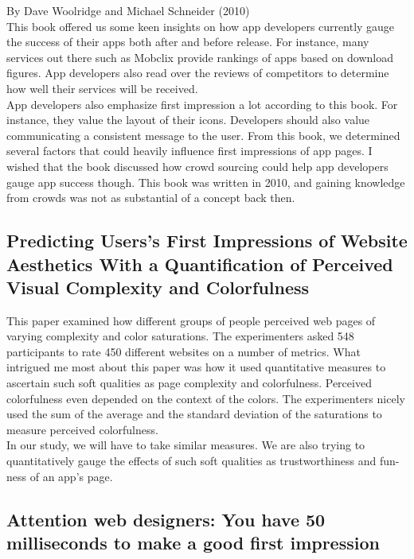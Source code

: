 By Dave Woolridge and Michael Schneider (2010) \\

This book offered us some keen insights on how app developers currently gauge the success of their apps both after and before release. For instance, many services out there such as Mobclix provide rankings of apps based on download figures. App developers also read over the reviews of competitors to determine how well their services will be received. \\

App developers also emphasize first impression a lot according to this book. For instance, they value the layout of their icons. Developers should also value communicating a consistent message to the user. From this book, we determined several factors that could heavily influence first impressions of app pages. I wished that the book discussed how crowd sourcing could help app developers gauge app success though. This book was written in 2010, and gaining knowledge from crowds was not as substantial of a concept back then.

\subsection{Predicting Users's First Impressions of Website Aesthetics With a Quantiﬁcation of Perceived Visual Complexity and Colorfulness}

This paper examined how different groups of people perceived web pages of varying complexity and color saturations. The experimenters asked 548 participants to rate 450 different websites on a number of metrics. What intrigued me most about this paper was how it used quantitative measures to ascertain such soft qualities as page complexity and colorfulness. Perceived colorfulness even depended on the context of the colors. The experimenters nicely used the sum of the average and the standard deviation of the saturations to measure perceived colorfulness. \\

In our study, we will have to take similar measures. We are also trying to quantitatively gauge the effects of such soft qualities as trustworthiness and fun-ness of an app's page.

\subsection{Attention web designers: You have 50 milliseconds to make a good first impression}

